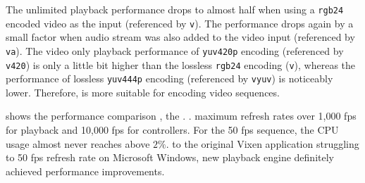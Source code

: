 The unlimited playback performance drops to almost half when using a \texttt{rgb24} encoded video as the input (referenced by \texttt{v}). The performance drops again by a small factor when audio stream was also added to the video input (referenced by \texttt{va}). The video only playback performance of \texttt{yuv420p} encoding (referenced by \texttt{v420}) is only a little bit higher than the lossless \texttt{rgb24} encoding (\texttt{v}), whereas the performance of lossless \texttt{yuv444p} encoding (referenced by \texttt{vyuv}) is noticeably lower. Therefore,  is more suitable for encoding video sequences.

  shows the performance comparison ,  the . .  maximum refresh rates  over 1,000 fps for playback and 10,000 fps for controllers. For the 50 fps  sequence, the CPU usage almost never reaches above $2 \%$.  to the original Vixen application struggling to  50 fps refresh rate on Microsoft Windows,  new playback engine definitely achieved  performance improvements.

